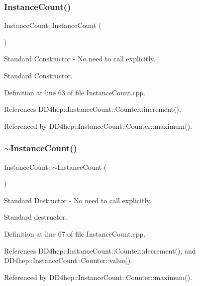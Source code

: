 \subsubsection{\texorpdfstring{Instance\+Count()}{InstanceCount()}}
{\footnotesize\ttfamily Instance\+Count\+::\+Instance\+Count (\begin{DoxyParamCaption}{ }\end{DoxyParamCaption})}



Standard Constructor -\/ No need to call explicitly. 

Standard Constructor. 

Definition at line 63 of file Instance\+Count.\+cpp.



References D\+D4hep\+::\+Instance\+Count\+::\+Counter\+::increment().



Referenced by D\+D4hep\+::\+Instance\+Count\+::\+Counter\+::maximum().

\hypertarget{struct_d_d4hep_1_1_instance_count_a7d9ff65ecca8d6024f7275ea93058ad7}{}\label{struct_d_d4hep_1_1_instance_count_a7d9ff65ecca8d6024f7275ea93058ad7} 
\subsubsection{\texorpdfstring{$\sim$\+Instance\+Count()}{~InstanceCount()}}
{\footnotesize\ttfamily Instance\+Count\+::$\sim$\+Instance\+Count (\begin{DoxyParamCaption}{ }\end{DoxyParamCaption})\hspace{0.3cm}{\ttfamily [virtual]}}



Standard Destructor -\/ No need to call explicitly. 

Standard destructor. 

Definition at line 67 of file Instance\+Count.\+cpp.



References D\+D4hep\+::\+Instance\+Count\+::\+Counter\+::decrement(), and D\+D4hep\+::\+Instance\+Count\+::\+Counter\+::value().



Referenced by D\+D4hep\+::\+Instance\+Count\+::\+Counter\+::maximum().



